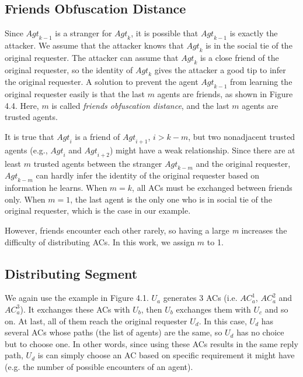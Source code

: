 \subsection{ Friends Obfuscation Distance}

\noindent Since ${Agt}_{k-1}$ is a stranger for ${Agt}_k$, it is possible that ${Agt}_{k-1}$ is exactly the attacker. We assume that the attacker knows that ${Agt}_k$ is in the social tie of the original requester. The attacker can assume that ${Agt}_k$ is a close friend of the original requester, so the identity of ${Agt}_k$ gives the attacker a good tip to infer the original requester. A solution to prevent the agent ${Agt}_{k-1}$ from learning the original requester easily is that the last $m$ agents are friends, as shown in Figure 4.4. Here, $m$ is called \textit{friends obfuscation distance}, and the last $m$ agents are trusted agents.

It is true that ${Agt}_i$ is a friend of ${Agt}_{i+1}$, $i>k-m$, but two nonadjacent trusted agents (e.g., ${Agt}_i$ and ${Agt}_{i+2}$) might have a weak relationship. Since there are at least $m$ trusted agents between the stranger ${Agt}_{k-m}$ and the original requester, ${Agt}_{k-m}$ can hardly infer the identity of the original requester based on information he learns. When $m=k$, all ACs must be exchanged between friends only. When $m=1$, the last agent is the only one who is in social tie of the original requester, which is the case in our example.

However, friends encounter each other rarely, so having a large \textit{m} increases the difficulty of distributing ACs. In this work, we assign $m$ to 1.



\subsection{ Distributing Segment}

\noindent We again use the example in Figure 4.1. $U_a$ generates 3 ACs (i.e. ${AC}^1_a$, ${AC}^2_a$ and ${AC}^3_a$). It exchanges these ACs with $U_b$, then $U_b$ exchanges them with $U_c$ and so on. At last, all of them reach the original requester $U_d$. In this case, $U_d$ has several ACs whose paths (the list of agents) are the same, so $U_d$ has no choice but to choose one. In other words, since using these ACs results in the same reply path, $U_d$ is can simply choose an AC based on specific requirement it might have (e.g. the number of possible encounters of an agent). 

